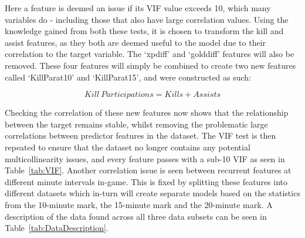 Here a feature is deemed an issue if its VIF value exceeds 10, which many variables do - including those that also have large correlation values.
Using the knowledge gained from both these tests, it is chosen to transform the kill and assist features, as they both are deemed useful to the model due to their correlation to the target variable.
The `xpdiff' and `golddiff' features will also be removed.
These four features will simply be combined to create two new features called `KillParat10' and `KillParat15', and were constructed as such:

\[ Kill \: Participations = Kills + Assists \]

Checking the correlation of these new features now shows that the relationship between the target remains stable, whilst removing the problematic large correlations between predictor features in the dataset.
The VIF test is then repeated to ensure that the dataset no longer contains any potential multicollinearity issues, and every feature passes with a sub-10 VIF as seen in Table~\ref{tab:VIF}.
Another correlation issue is seen between recurrent features at different minute intervals in-game.
This is fixed by splitting these features into different datasets which in-turn will create separate models based on the statistics from the 10-minute mark, the 15-minute mark and the 20-minute mark.
A description of the data found across all three data subsets can be seen in Table~\ref{tab:DataDescription}. \\

